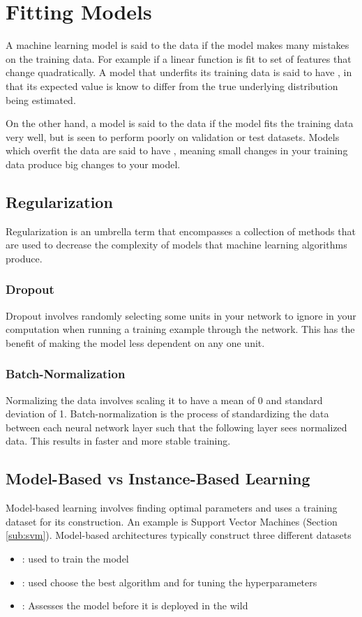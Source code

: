 \section{Fitting Models}

A machine learning model is said to  the data if the model makes many mistakes on the training data. For example if a linear function is fit to set of features that change quadratically. A model that underfits its training data is said to have , in that its expected value is know to differ from the true underlying distribution being estimated.

On the other hand, a model is said to  the data if the model fits the training data very well, but is seen to perform poorly on validation or test datasets. Models which overfit the data are said to have , meaning small changes in your training data produce big changes to your model.

\subsection{Regularization}
Regularization is an umbrella term that encompasses a collection of methods that are used to decrease the complexity of models that machine learning algorithms produce.

\subsubsection{Dropout}
Dropout involves randomly selecting some units in your network to ignore in your computation when running a training example through the network. This has the benefit of making the model less dependent on any one unit.

\subsubsection{Batch-Normalization}
Normalizing the data involves scaling it to have a mean of 0 and standard deviation of 1. Batch-normalization is the process of standardizing the data between each neural network layer such that the following layer sees normalized data. This results in faster and more stable training. 

\subsection{Model-Based vs Instance-Based Learning}
Model-based learning involves finding optimal parameters and uses a training dataset for its construction. An example is Support Vector Machines (Section \ref{sub:svm}). Model-based architectures typically construct three different datasets
\begin{itemize}
    \item {}: used to train the model
    \item {}: used choose the best algorithm and  for tuning the hyperparameters 
    \item {}: Assesses the model before it is deployed in the wild
\end{itemize}

